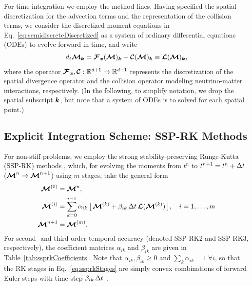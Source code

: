 \documentclass[10pt,preprint]{aastex}
\begin{document}
For time integration we employ the method lines.  
Having specified the spatial discretization for the advection terms and the representation of the collision terms, we consider the discretized moment equations in Eq.~\eqref{eq:semidiscreteDiscretized} as a system of ordinary differential equations (ODEs) to evolve forward in time, and write
\begin{equation}
  d_{t}\boldsymbol{\mathcal{M}}_{\boldsymbol{k}}
  =\boldsymbol{\mathcal{F}}_{\boldsymbol{x}}(\boldsymbol{\mathcal{M}})_{\boldsymbol{k}}+\boldsymbol{\mathcal{C}}(\boldsymbol{\mathcal{M}})_{\boldsymbol{k}}
  \equiv\boldsymbol{\mathcal{L}}(\boldsymbol{\mathcal{M}})_{\boldsymbol{k}},
  \label{eq:momentEquationsODEs}
\end{equation}
where the operator $\boldsymbol{\mathcal{F}}_{\boldsymbol{x}},\boldsymbol{\mathcal{C}}:\mathbb{R}^{d+1}\to\mathbb{R}^{d+1}$ represents the discretization of the spatial divergence operator and the collision operator modeling neutrino-matter interactions, respectively.  
(In the following, to simplify notation, we drop the spatial subscript $\boldsymbol{k}$, but note that a system of ODEs is to solved for each spatial point.)

\subsection{Explicit Integration Scheme: SSP-RK Methods}
\label{sec:explicitTime}

For non-stiff problems, we employ the strong stability-preserving Runge-Kutta (SSP-RK) methods \citep[e.g.,][]{gottlieb_etal_2001}, which, for evolving the moments from $t^{n}$ to $t^{n+1}=t^{n}+\Delta t$ ($\boldsymbol{\mathcal{M}}^{n}\to\boldsymbol{\mathcal{M}}^{n+1}$) using $m$ stages, take the general form
\begin{align}
  \boldsymbol{\mathcal{M}}^{(0)}
  &=\boldsymbol{\mathcal{M}}^{n}, \\
  \boldsymbol{\mathcal{M}}^{(i)}
  &=\sum_{k=0}^{i-1}\alpha_{ik}\,\big[\,\boldsymbol{\mathcal{M}}^{(k)}+\beta_{ik}\,\Delta t\,\boldsymbol{\mathcal{L}}(\boldsymbol{\mathcal{M}}^{(k)})\,\big], \quad i=1,\ldots,m 
  \label{eq:ssprkStages} \\
  \boldsymbol{\mathcal{M}}^{n+1}
  &=\boldsymbol{\mathcal{M}}^{(m)}.  
\end{align}
For second- and third-order temporal accuracy (denoted SSP-RK2 and SSP-RK3, respectively), the coefficient matrices $\alpha_{ik}$ and $\beta_{ik}$ are given in Table~\ref{tab:ssprkCoefficients}.  
Note that $\alpha_{ik},\beta_{ik}\ge0$ and $\sum_{k}\alpha_{ik}=1~\forall i$, so that the RK stages in Eq.~\eqref{eq:ssprkStages} are simply convex combinations of forward Euler steps with time step $\beta_{ik}\,\Delta t$ \citep{shuOsher_1988}.  
\end{document}
